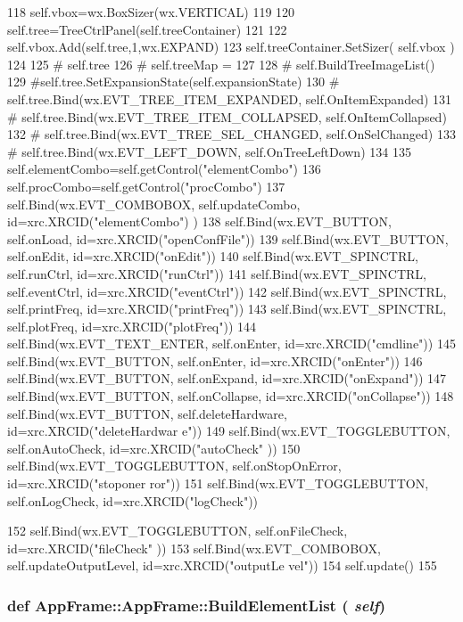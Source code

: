 \begin{DoxyCode}
118         self.vbox=wx.BoxSizer(wx.VERTICAL)
119         
120         self.tree=TreeCtrlPanel(self.treeContainer)
121 
122         self.vbox.Add(self.tree,1,wx.EXPAND)
123         self.treeContainer.SetSizer( self.vbox )
124 
125 #        self.tree
126 #        self.treeMap = {}
127 
128 #        self.BuildTreeImageList()
129         #self.tree.SetExpansionState(self.expansionState)
130 #        self.tree.Bind(wx.EVT_TREE_ITEM_EXPANDED, self.OnItemExpanded)
131 #        self.tree.Bind(wx.EVT_TREE_ITEM_COLLAPSED, self.OnItemCollapsed)
132 #        self.tree.Bind(wx.EVT_TREE_SEL_CHANGED, self.OnSelChanged)
133 #        self.tree.Bind(wx.EVT_LEFT_DOWN, self.OnTreeLeftDown)
134 
135         self.elementCombo=self.getControl("elementCombo")
136         self.procCombo=self.getControl("procCombo")
137         self.Bind(wx.EVT_COMBOBOX, self.updateCombo, id=xrc.XRCID("elementCombo")
      )        
138         self.Bind(wx.EVT_BUTTON, self.onLoad, id=xrc.XRCID("openConfFile"))
139         self.Bind(wx.EVT_BUTTON, self.onEdit, id=xrc.XRCID("onEdit"))
140         self.Bind(wx.EVT_SPINCTRL, self.runCtrl, id=xrc.XRCID("runCtrl"))
141         self.Bind(wx.EVT_SPINCTRL, self.eventCtrl, id=xrc.XRCID("eventCtrl"))
142         self.Bind(wx.EVT_SPINCTRL, self.printFreq, id=xrc.XRCID("printFreq"))
143         self.Bind(wx.EVT_SPINCTRL, self.plotFreq, id=xrc.XRCID("plotFreq"))
144         self.Bind(wx.EVT_TEXT_ENTER, self.onEnter, id=xrc.XRCID("cmdline"))
145         self.Bind(wx.EVT_BUTTON, self.onEnter, id=xrc.XRCID("onEnter"))
146         self.Bind(wx.EVT_BUTTON, self.onExpand, id=xrc.XRCID("onExpand"))
147         self.Bind(wx.EVT_BUTTON, self.onCollapse, id=xrc.XRCID("onCollapse"))
148         self.Bind(wx.EVT_BUTTON, self.deleteHardware, id=xrc.XRCID("deleteHardwar
      e"))
149         self.Bind(wx.EVT_TOGGLEBUTTON, self.onAutoCheck, id=xrc.XRCID("autoCheck"
      ))
150         self.Bind(wx.EVT_TOGGLEBUTTON, self.onStopOnError, id=xrc.XRCID("stoponer
      ror"))
151         self.Bind(wx.EVT_TOGGLEBUTTON, self.onLogCheck, id=xrc.XRCID("logCheck"))
      
152         self.Bind(wx.EVT_TOGGLEBUTTON, self.onFileCheck, id=xrc.XRCID("fileCheck"
      ))
153         self.Bind(wx.EVT_COMBOBOX, self.updateOutputLevel, id=xrc.XRCID("outputLe
      vel"))        
154         self.update()
155                 
\end{DoxyCode}
\hypertarget{classAppFrame_1_1AppFrame_a44b82952390e069b184afd5986991ba4}{
\subsubsection[{BuildElementList}]{\setlength{\rightskip}{0pt plus 5cm}def AppFrame::AppFrame::BuildElementList ( {\em self})}}
\label{classAppFrame_1_1AppFrame_a44b82952390e069b184afd5986991ba4}


